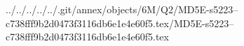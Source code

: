 ../../../../../.git/annex/objects/6M/Q2/MD5E-s5223--c738fff9b2d0473f3116db6e1e4e60f5.tex/MD5E-s5223--c738fff9b2d0473f3116db6e1e4e60f5.tex